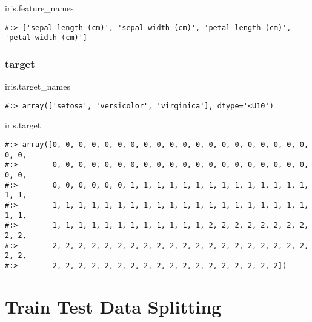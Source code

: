 \documentclass[
]{book}
\newenvironment{Shaded}{\begin{snugshade}}{\end{snugshade}}
\newcommand{\NormalTok}[1]{#1}
\begin{document}
\begin{Shaded}
\begin{Highlighting}[]
\NormalTok{iris.feature\_names}
\end{Highlighting}
\end{Shaded}

\begin{verbatim}
#:> ['sepal length (cm)', 'sepal width (cm)', 'petal length (cm)', 'petal width (cm)']
\end{verbatim}

\hypertarget{target}{%
\subsubsection{target}\label{target}}

\begin{Shaded}
\begin{Highlighting}[]
\NormalTok{iris.target\_names}
\end{Highlighting}
\end{Shaded}

\begin{verbatim}
#:> array(['setosa', 'versicolor', 'virginica'], dtype='<U10')
\end{verbatim}

\begin{Shaded}
\begin{Highlighting}[]
\NormalTok{iris.target}
\end{Highlighting}
\end{Shaded}

\begin{verbatim}
#:> array([0, 0, 0, 0, 0, 0, 0, 0, 0, 0, 0, 0, 0, 0, 0, 0, 0, 0, 0, 0, 0, 0,
#:>        0, 0, 0, 0, 0, 0, 0, 0, 0, 0, 0, 0, 0, 0, 0, 0, 0, 0, 0, 0, 0, 0,
#:>        0, 0, 0, 0, 0, 0, 1, 1, 1, 1, 1, 1, 1, 1, 1, 1, 1, 1, 1, 1, 1, 1,
#:>        1, 1, 1, 1, 1, 1, 1, 1, 1, 1, 1, 1, 1, 1, 1, 1, 1, 1, 1, 1, 1, 1,
#:>        1, 1, 1, 1, 1, 1, 1, 1, 1, 1, 1, 1, 2, 2, 2, 2, 2, 2, 2, 2, 2, 2,
#:>        2, 2, 2, 2, 2, 2, 2, 2, 2, 2, 2, 2, 2, 2, 2, 2, 2, 2, 2, 2, 2, 2,
#:>        2, 2, 2, 2, 2, 2, 2, 2, 2, 2, 2, 2, 2, 2, 2, 2, 2, 2])
\end{verbatim}

\hypertarget{train-test-data-splitting}{%
\section{Train Test Data Splitting}\label{train-test-data-splitting}}
\end{document}
